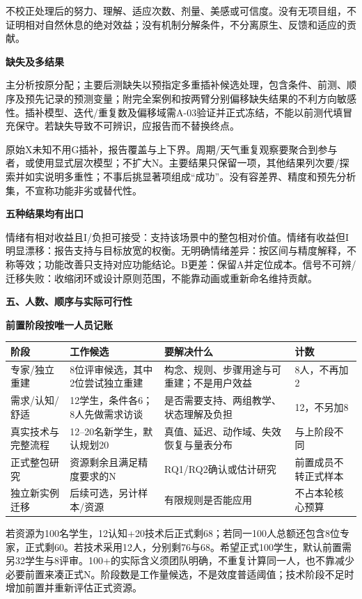 \documentclass[11pt,a4paper]{article}
\newcommand{\reviewsection}[1]{\par\Needspace{6\baselineskip}\begin{center}{\titlelatin\titlecjk\bfseries\fontsize{14}{20}\selectfont #1}\end{center}}
\newcommand{\reviewsubsection}[1]{\par\Needspace{4\baselineskip}\begin{center}{\titlelatin\titlecjk\bfseries\fontsize{12}{18}\selectfont #1}\end{center}}
\begin{document}
不校正处理后的努力、理解、适应次数、剂量、美感或可信度。没有无项目组，不证明相对自然休息的绝对效益；没有机制分解条件，不分离原生、反馈和适应的贡献。

\reviewsubsection{4.2 缺失及多结果}
主分析按原分配；主要后测缺失以预指定多重插补候选处理，包含条件、前测、顺序及预先记录的预测变量；附完全案例和按两臂分别偏移缺失结果的不利方向敏感性。插补模型、迭代/重复数及偏移域需A-03验证并正式冻结，不能以前测代填冒充保守。若缺失导致不可辨识，应报告而不替换终点。

原始X未知不用G插补，报告覆盖与上下界。周期/天气重复观察要聚合到参与者，或使用显式层次模型；不扩大N。主要结果只保留一项，其他结果列次要/探索并如实说明多重性；不事后挑显著项组成“成功”。没有容差界、精度和预先分析集，不宣称功能非劣或替代性。

\reviewsubsection{4.3 五种结果均有出口}
情绪有相对收益且I/负担可接受：支持该场景中的整包相对价值。情绪有收益但I明显漂移：报告支持与目标放宽的权衡。无明确情绪差异：按区间与精度解释，不称等效；功能改善只支持对应功能结论。B更差：保留A并定位成本。信号不可辨/迁移失败：收缩闭环或设计原则范围，不能靠动画或重新命名维持贡献。

\reviewsection{五、人数、顺序与实际可行性}
\reviewsubsection{5.1 前置阶段按唯一人员记账}
\begin{longtable}{L{34mm}L{25mm}L{72mm}L{23mm}}
阶段 & 工作候选 & 要解决什么 & 计数\\\hline
专家/独立重建 & 8位评审候选，其中2位尝试独立重建 & 构念、规则、步骤用途与可重建；不是用户效益 & 8人，不再加2\\
需求/认知/舒适 & 12学生，条件各6；8人先做需求访谈 & 是否需要支持、两组教学、状态理解及负担 & 12，不另加8\\
真实技术与完整流程 & 12--20名新学生，默认规划20 & 真值、延迟、动作域、失效恢复与量表分布 & 与上阶段不同\\
正式整包研究 & 资源剩余且满足精度要求的N & RQ1/RQ2确认或估计研究 & 前置成员不转正式样本\\
独立新实例迁移 & 后续可选，另计样本/资源 & 有限规则是否能应用 & 不占本轮核心预算\\
\end{longtable}

若资源为100名学生，12认知+20技术后正式剩68；若同一100人总额还包含8位专家，正式剩60。若技术采用12人，分别剩76与68。希望正式100学生，默认前置需另32学生与8评审。100+的实际含义须团队明确，不重复计算同一人，也不靠减少必要前置来凑正式N。阶段数是工作量候选，不是效度普适阈值；技术阶段不足时增加前置并重新评估正式资源。
\end{document}
